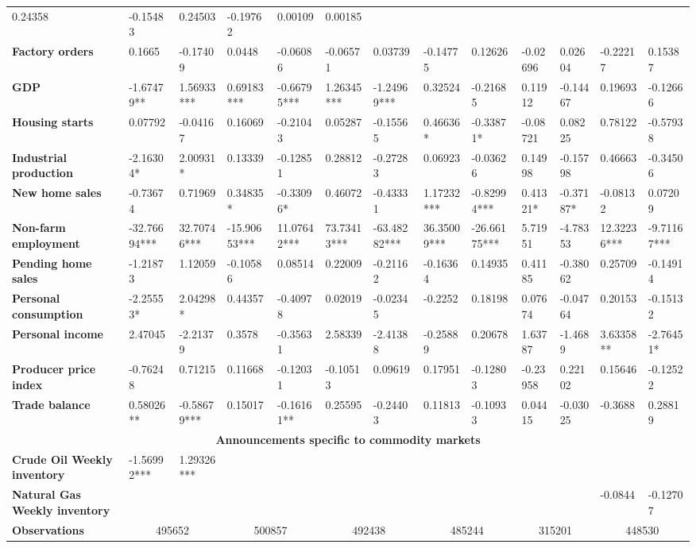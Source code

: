 \begin{sidewaystable}
{\begin{tabular}{@{}lllllllllllll@{}}
0.24358 & -0.15483 & 0.24503 & -0.19762 & 0.00109 & 0.00185 \\ \textbf{Factory orders}& 0.1665 & -0.17409 & 0.0448 & -0.06086 & -0.06571 & 0.03739 & -0.14775 & 0.12626 & -0.02696 & 0.02604 & -0.22217 & 0.15387 \\ \textbf{GDP}& -1.67479** & 1.56933*** & 0.69183*** & -0.66795*** & 1.26345*** & -1.24969*** & 0.32524 & -0.21685 & 0.11912 & -0.14467 & 0.19693 & -0.12666 \\ \textbf{Housing starts}& 0.07792 & -0.04167 & 0.16069 & -0.21043 & 0.05287 & -0.15565 & 0.46636* & -0.33871* & -0.08721 & 0.08225 & 0.78122 & -0.57938 \\ \textbf{Industrial production}& -2.16304* & 2.00931* & 0.13339 & -0.12851 & 0.28812 & -0.27283 & 0.06923 & -0.03626 & 0.14998 & -0.15798 & 0.46663 & -0.34506 \\ \textbf{New home sales}& -0.73674 & 0.71969 & 0.34835* & -0.33096* & 0.46072 & -0.43331 & 1.17232*** & -0.82994*** & 0.41321* & -0.37187* & -0.08132 & 0.07209 \\ \textbf{Non-farm employment}& -32.76694*** & 32.70746*** & -15.90653*** & 11.07642*** & 73.73413*** & -63.48282*** & 36.35009*** & -26.66175*** & 5.71951 & -4.78353 & 12.32236*** & -9.71167*** \\ \textbf{Pending home sales}& -1.21873 & 1.12059 & -0.10586 & 0.08514 & 0.22009 & -0.21162 & -0.16364 & 0.14935 & 0.41185 & -0.38062 & 0.25709 & -0.14914 \\ \textbf{Personal consumption}& -2.25553* & 2.04298* & 0.44357 & -0.40978 & 0.02019 & -0.02345 & -0.2252 & 0.18198 & 0.07674 & -0.04764 & 0.20153 & -0.15132 \\ \textbf{Personal income}& 2.47045 & -2.21379 & 0.3578 & -0.35631 & 2.58339 & -2.41388 & -0.25889 & 0.20678 & 1.63787 & -1.4689 & 3.63358** & -2.76451* \\ \textbf{Producer price index}& -0.76248 & 0.71215 & 0.11668 & -0.12031 & -0.10513 & 0.09619 & 0.17951 & -0.12803 & -0.23958 & 0.22102 & 0.15646 & -0.12522 \\ \textbf{Trade balance}& 0.58026** & -0.58679*** & 0.15017 & -0.16161** & 0.25595 & -0.24403 & 0.11813 & -0.10933 & 0.04415 & -0.03025 & -0.3688 & 0.28819 \\  \midrule \multicolumn{13}{c}{\textbf{Announcements specific to commodity markets}} \\ \midrule \textbf{Crude Oil Weekly inventory}& -1.56992*** & 1.29326*** &  &  &  &  &  &  &  &  &  &  \\ \textbf{Natural Gas Weekly inventory}&  &  &  &  &  &  &  &  &  &  & -0.0844 & -0.12707 \\  \midrule \textbf{Observations}             &\multicolumn{2}{c}{ 495652 }                                                 & \multicolumn{2}{c}{ 500857 }                                                 & \multicolumn{2}{c}{ 492438 }                                                 & \multicolumn{2}{c}{ 485244 }                                                 & \multicolumn{2}{c}{ 315201 }                                                   & \multicolumn{2}{c}{ 448530 }                                                
\end{tabular}}
\end{sidewaystable}
